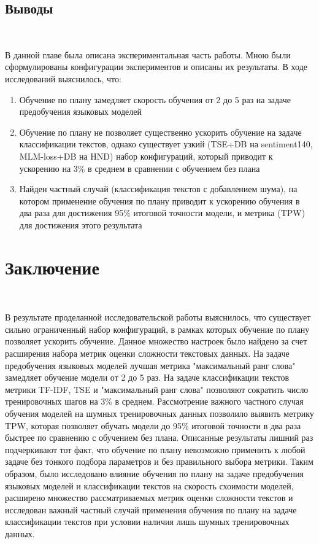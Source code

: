 \documentclass{spbau-diploma}
\begin{document}
\subsection{Выводы}
\ 

В данной главе была описана экспериментальная часть работы. Мною были сформулированы конфигурации экспериментов и описаны их результаты. В ходе исследований выяснилось, что:

\begin{enumerate}
	\item Обучение по плану замедляет скорость обучения от 2 до 5 раз на задаче предобучения языковых моделей
	\item Обучение по плану не позволяет существенно ускорить обучение на задаче классификации текстов, однако существует узкий (TSE+DB на sentiment140, MLM-loss+DB на HND) набор конфигураций, который приводит к ускорению на 3\% в среднем в сравнении с обучением без плана
	\item Найден частный случай (классификация текстов с добавлением шума), на котором применение обучения по плану приводит к ускорению обучения в два раза для достижения 95\% итоговой точности модели, и метрика (TPW) для достижения этого результата
\end{enumerate}

\section*{Заключение}
\ 

В результате проделанной исследовательской работы выяснилось, что существует сильно ограниченный набор конфигураций, в рамках которых обучение по плану позволяет ускорить обучение. Данное множество настроек было найдено за счет расширения набора метрик оценки сложности текстовых данных. На задаче предобучения языковых моделей лучшая метрика "максимальный ранг слова" замедляет обучение модели от 2 до 5 раз. На задаче классификации текстов метрики TF-IDF, TSE и "максимальный ранг слова" позволяют сократить число тренировочных шагов на 3\% в среднем. Рассмотрение важного частного случая обучения моделей на шумных тренировочных данных позволило выявить метрику TPW, которая позволяет обучать модели до 95\% итоговой точности в два раза быстрее по сравнению с обучением без плана. Описанные результаты лишний раз подчеркивают тот факт, что обучение по плану невозможно применить к любой задаче без тонкого подбора параметров и без правильного выбора метрики. Таким образом, было исследовано влияние обучения по плану на задаче предобучения языковых моделей и классификации текстов на скорость схоимости моделей, расширено множество рассматриваемых метрик оценки сложности текстов и исследован важный частный случай применения обучения по плану на задаче классификации текстов при условии наличия лишь шумных тренировочных данных.
\end{document}

